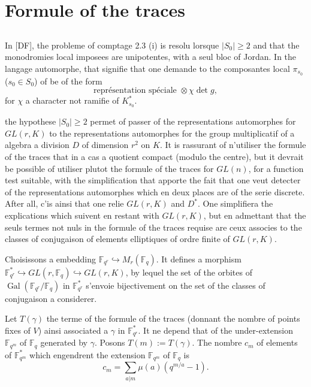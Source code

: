 \documentclass[11pt,a4paper]{article}
\theoremstyle{plain}
\theoremstyle{definition}
\DeclareMathOperator{\Gal}{Gal}
\newcommand{\F}{\mathbb{F}}
\begin{document}
\section{Formule of the traces}

\subsection{}
In [DF], the probleme of comptage 2.3 (i) is resolu lorsque $|S_0| \geq 2$ and that the monodromies local imposees are unipotentes, with a seul bloc of Jordan. In the langage automorphe, that signifie that one demande to the composantes local $\pi_{s_0}$ ($s_0 \in S_0$) of be of the form
\begin{equation}
\text{repr\'esentation sp\'eciale } \otimes \chi \det g,
\tag{4.1.1}
\end{equation}
for $\chi$ a character not ramifie of $K_{s_0}^*$.

the hypothese $|S_0| \geq 2$ permet of passer of the representations automorphes for $GL(r, K)$ to the representations automorphes for the group multiplicatif of a algebra a division $D$ of dimension $r^2$ on $K$. It is rassurant of n'utiliser the formule of the traces that in a cas a quotient compact (modulo the centre), but it devrait be possible of utiliser plutot the formule of the traces for $GL(n)$, for a function test suitable, with the simplification that apporte the fait that one veut detecter of the representations automorphes which en deux places are of the serie discrete. After all, c'is ainsi that one relie $GL(r, K)$ and $D^*$. One simplifiera the explications which suivent en restant with $GL(r, K)$, but en admettant that the seuls termes not nuls in the formule of the traces requise are ceux associes to the classes of conjugaison of elements elliptiques of ordre finite of $GL(r, K)$.

Choisissons a embedding $\F_{q^r} \hookrightarrow M_r(\F_q)$. It defines a morphism $\F_{q^r}^* \hookrightarrow GL(r, \F_q) \hookrightarrow GL(r, K)$, by lequel the set of the orbites of $\Gal(\F_{q^r}/\F_q)$ in $\F_{q^r}^*$ s'envoie bijectivement on the set of the classes of conjugaison a considerer.

Let $T(\gamma)$ the terme of the formule of the traces (donnant the nombre of points fixes of $V$) ainsi associated a $\gamma$ in $\F_{q^r}^*$. It ne depend that of the under-extension $\F_{q^m}$ of $\F_q$ generated by $\gamma$. Posons $T(m) := T(\gamma)$. The nombre $c_m$ of elements of $\F_{q^m}^*$ which engendrent the extension $\F_{q^m}$ of $\F_q$ is
\[
c_m = \sum_{a|m} \mu(a)(q^{m/a} - 1).
\]
\end{document}
